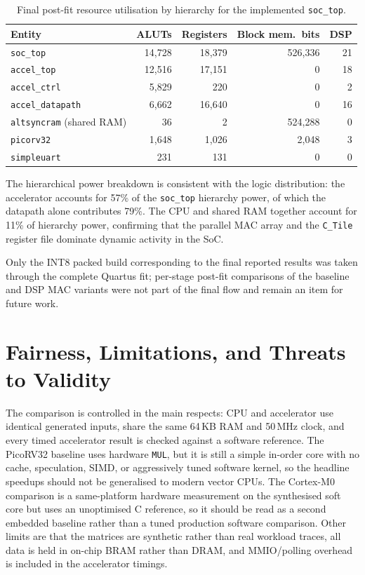 \begin{table}[htbp]
  \centering
  \small
  \begin{tabular}{lrrrr}
  \toprule
  Entity & ALUTs & Registers & Block mem.\ bits & DSP \\
  \midrule
  \texttt{soc\_top}              & 14,728 & 18,379 & 526,336 & 21 \\
  \quad\texttt{accel\_top}       & 12,516 & 17,151 & 0       & 18 \\
  \quad\quad\texttt{accel\_ctrl} &  5,829 &    220 & 0       &  2 \\
  \quad\quad\texttt{accel\_datapath} &  6,662 & 16,640 & 0  & 16 \\
  \quad\texttt{altsyncram} (shared RAM) & 36 & 2 & 524,288 & 0 \\
  \quad\texttt{picorv32}         &  1,648 &  1,026 & 2,048   &  3 \\
  \quad\texttt{simpleuart}       &    231 &    131 & 0       &  0 \\
  \bottomrule
  \end{tabular}
  \caption{Final post-fit resource utilisation by hierarchy for the
           implemented \texttt{soc\_top}.}
  \label{tab:quartus-hierarchy}
\end{table}

The hierarchical power breakdown is consistent with the logic
distribution: the accelerator accounts for 57\% of the
\texttt{soc\_top} hierarchy power, of which the datapath alone
contributes 79\%. The CPU and shared RAM together account for
11\% of hierarchy power, confirming that the parallel MAC array and
the \texttt{C\_Tile} register file dominate dynamic activity in the
SoC.

Only the INT8 packed build corresponding to the final reported
results was taken through the complete Quartus fit; per-stage post-fit
comparisons of the baseline and DSP MAC variants were not part of
the final flow and remain an item for future work.

\section{Fairness, Limitations, and Threats to Validity}
\label{sec:threats}

The comparison is controlled in the main respects: CPU and accelerator
use identical generated inputs, share the same 64\,KB RAM and 50\,MHz
clock, and every timed accelerator result is checked against a software
reference. The PicoRV32 baseline uses hardware \texttt{MUL}, but it is
still a simple in-order core with no cache, speculation, SIMD, or
aggressively tuned software kernel, so the headline speedups should not
be generalised to modern vector CPUs. The Cortex-M0 comparison is a
same-platform hardware measurement on the synthesised soft core but uses
an unoptimised C reference, so it should be read as a second embedded
baseline rather than a tuned production software comparison. Other
limits are that the matrices are synthetic rather than real workload
traces, all data is held in on-chip BRAM rather than DRAM, and
MMIO/polling overhead is included in the accelerator timings.

